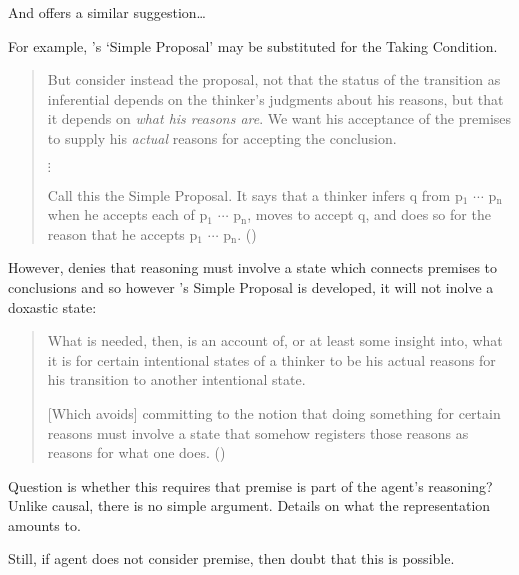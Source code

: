 \begin{note}
  And \citeauthor{Wright:2014tt} offers a similar suggestion\dots

  For example, \citeauthor{Wright:2014tt}'s `Simple Proposal' may be substituted for the Taking Condition.
  \begin{quote}
    But consider instead the proposal, not that the status of the transition as inferential depends on the thinker’s judgments about his reasons, but that it depends on \emph{what his reasons are}.
    We want his acceptance of the premises to supply his \emph{actual} reasons for accepting the conclusion.

    \mbox{}\hfill\(\vdots\)\hfill\mbox{}

    Call this the Simple Proposal.
    It says that a thinker infers q from p\(_{1}\) \(\cdots\) p\(_{\text{n}}\) when he accepts each of p\(_{1}\) \(\cdots\) p\(_{\text{n}}\), moves to accept q, and does so for the reason that he accepts p\(_{1}\) \(\cdots\) p\(_{\text{n}}\).\newline
      \mbox{}\hfill\mbox{(\Citeyear[33]{Wright:2014tt})}
    \end{quote}

    However, \citeauthor{Wright:2014tt} denies that reasoning must involve a state which connects premises to conclusions and so however \citeauthor{Wright:2014tt}'s Simple Proposal is developed, it will not inolve a doxastic state:

    \begin{quote}
      What is needed, then, is an account of, or at least some insight into, what it is for certain intentional states of a thinker to be his actual reasons for his transition to another intentional state.

      [Which avoids] committing to the notion that doing something for certain reasons must involve a state that somehow registers those reasons as reasons for what one does.\nolinebreak
      \mbox{}\hfill\mbox{(\Citeyear[34]{Wright:2014tt})}
    \end{quote}
\end{note}

\begin{note}
  Question is whether this requires that premise is part of the agent's reasoning?
  Unlike causal, there is no simple argument.
  Details on what the representation amounts to.

  Still, if agent does not consider premise, then doubt that this is possible.
\end{note}

